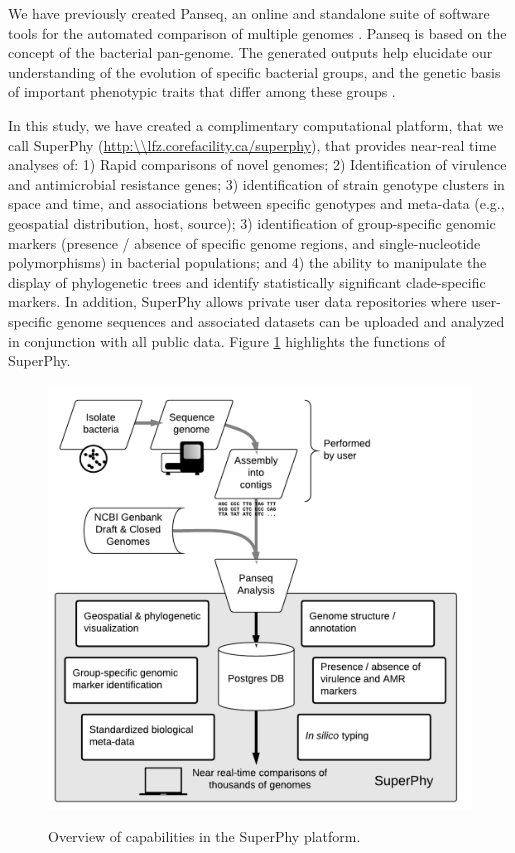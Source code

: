 \documentclass[a4paper,twoside]{article}
\begin{document}
{We have previously created Panseq, an online and standalone suite of software tools for the automated comparison of multiple genomes \cite{laing_pan-genome_2010,laing_identification_2011}. Panseq is based on the concept of the bacterial pan-genome. The generated outputs help elucidate our understanding of the evolution of specific bacterial groups, and the genetic basis of important phenotypic traits that differ among these groups \cite{laing_pan-genome_2010}.

In this study, we have created a complimentary computational platform, that we call SuperPhy (\url{http:\\lfz.corefacility.ca/superphy}), that provides near-real time analyses of: 1) Rapid comparisons of novel genomes; 2) Identification of virulence and antimicrobial resistance genes; 3) identification of strain genotype clusters in space and time, and associations between specific genotypes and meta-data (e.g., geospatial distribution, host, source); 3) identification of group-specific genomic markers (presence / absence of specific genome regions, and single-nucleotide polymorphisms) in bacterial populations; and 4) the ability to manipulate the display of phylogenetic trees and identify statistically significant clade-specific markers. In addition, SuperPhy allows private user data repositories where user-specific genome sequences and associated datasets can be uploaded and analyzed in conjunction with all public data. Figure \ref{fig:capabilities} highlights the functions of SuperPhy.

\begin{figure}[t]
  \vspace{-0.2cm}
  \centering
   {\includegraphics[width=13cm]{capabilities.pdf}}
  \caption{Overview of capabilities in the SuperPhy platform.}
  \label{fig:capabilities}
\end{figure}

}
\end{document}
